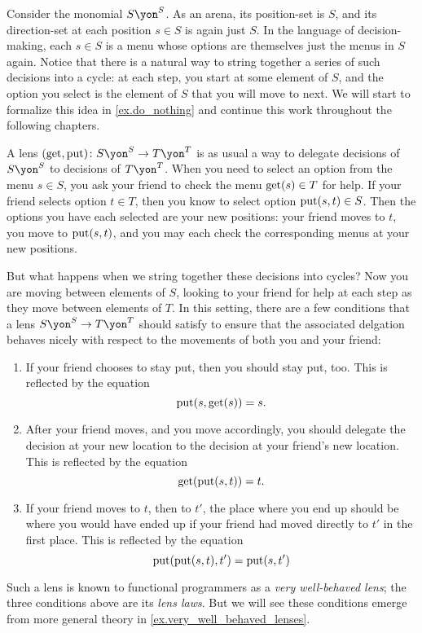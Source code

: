 \documentclass[Book-Poly]{subfiles}
\begin{document}
\begin{example} \label{ex.lens_get_put}
Consider the monomial $S\yon^S$. As an arena, its position-set is $S$, and its direction-set at each position $s\in S$ is again just $S$.
In the language of decision-making, each $s \in S$ is a menu whose options are themselves just the menus in $S$ again.
Notice that there is a natural way to string together a series of such decisions into a cycle: at each step, you start at some element of $S$, and the option you select is the element of $S$ that you will move to next.
We will start to formalize this idea in \cref{ex.do_nothing} and continue this work throughout the following chapters.

A lens $(\lensget,\lensput)\colon S\yon^S\to T\yon^T$ is as usual a way to delegate decisions of $S\yon^S$ to decisions of $T\yon^T$.
When you need to select an option from the menu $s \in S$, you ask your friend to check the menu $\mathrm{get}(s) \in T$ for help.
If your friend selects option $t \in T$, then you know to select option $\mathrm{put}(s, t) \in S$.
Then the options you have each selected are your new positions: your friend moves to $t$, you move to $\mathrm{put}(s, t)$, and you may each check the corresponding menus at your new positions.

But what happens when we string together these decisions into cycles?
Now you are moving between elements of $S$, looking to your friend for help at each step as they move between elements of $T$.
In this setting, there are a few conditions that a lens $S\yon^S \to T\yon^T$ should satisfy to ensure that the associated delgation behaves nicely with respect to the movements of both you and your friend:
\begin{enumerate}
    \item If your friend chooses to stay put, then you should stay put, too.
    This is reflected by the equation
    \[
        \mathrm{put}(s,\mathrm{get}(s))=s.
    \]
    
    \item After your friend moves, and you move accordingly, you should delegate the decision at your new location to the decision at your friend's new location.
    This is reflected by the equation
    \[
        \mathrm{get}(\mathrm{put}(s,t))=t.
    \]

    \item If your friend moves to $t$, then to $t'$, the place where you end up should be where you would have ended up if your friend had moved directly to $t'$ in the first place.
    This is reflected by the equation
    \[
        \mathrm{put}(\mathrm{put}(s,t),t')=\mathrm{put}(s,t')
    \]
\end{enumerate}
Such a lens is known to functional programmers as a \emph{very well-behaved lens}; the three conditions above are its \emph{lens laws}.
But we will see these conditions emerge from more general theory in \cref{ex.very_well_behaved_lenses}.
\end{example}
\end{document}
